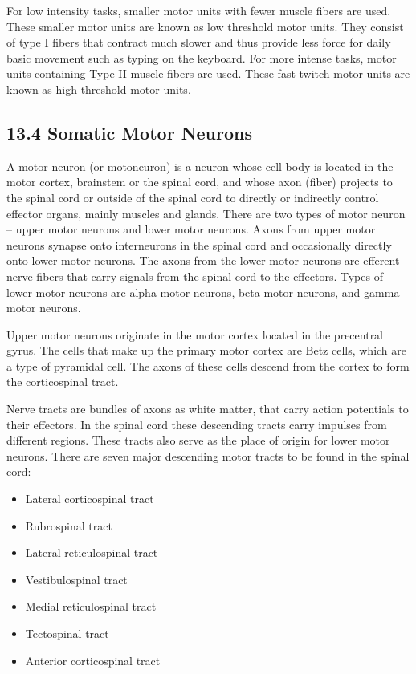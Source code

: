 For low intensity tasks, smaller motor units with fewer muscle fibers
are used. These smaller motor units are known as low threshold motor
units. They consist of type I fibers that contract much slower and thus
provide less force for daily basic movement such as typing on the
keyboard. For more intense tasks, motor units containing Type II muscle
fibers are used. These fast twitch motor units are known as high
threshold motor units.

\hypertarget{somatic-motor-neurons}{%
\subsection{\texorpdfstring{{13.4} Somatic Motor
Neurons}{13.4 Somatic Motor Neurons}}\label{somatic-motor-neurons}}

A motor neuron (or motoneuron) is a neuron whose cell body is located in
the motor cortex, brainstem or the spinal cord, and whose axon (fiber)
projects to the spinal cord or outside of the spinal cord to directly or
indirectly control effector organs, mainly muscles and glands. There are
two types of motor neuron -- upper motor neurons and lower motor
neurons. Axons from upper motor neurons synapse onto interneurons in the
spinal cord and occasionally directly onto lower motor neurons. The
axons from the lower motor neurons are efferent nerve fibers that carry
signals from the spinal cord to the effectors. Types of lower motor
neurons are alpha motor neurons, beta motor neurons, and gamma motor
neurons.

Upper motor neurons originate in the motor cortex located in the
precentral gyrus. The cells that make up the primary motor cortex are
Betz cells, which are a type of pyramidal cell. The axons of these cells
descend from the cortex to form the corticospinal tract.

Nerve tracts are bundles of axons as white matter, that carry action
potentials to their effectors. In the spinal cord these descending
tracts carry impulses from different regions. These tracts also serve as
the place of origin for lower motor neurons. There are seven major
descending motor tracts to be found in the spinal cord:

\begin{itemize}
\tightlist
\item
  Lateral corticospinal tract
\item
  Rubrospinal tract
\item
  Lateral reticulospinal tract
\item
  Vestibulospinal tract
\item
  Medial reticulospinal tract
\item
  Tectospinal tract
\item
  Anterior corticospinal tract
\end{itemize}

